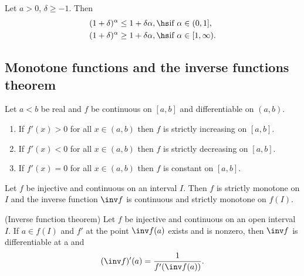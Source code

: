 \documentclass{article}
\begin{document}
\begin{lemma*}
    Let $a>0$, $\delta \geq -1$. Then
    \begin{align*}
        (1+\delta)^\alpha&\leq 1+\delta\alpha,\hs\text{if }\alpha\in(0,1],\\
        (1+\delta)^\alpha&\geq 1+\delta\alpha,\hs\text{if }\alpha\in[1,\infty).
    \end{align*} 
\end{lemma*}

\subsection{Monotone functions and the inverse functions theorem}

\setcounter{theorem}{1}
\begin{theorem}[Ross, 29.7]
   Let $a<b$ be real and $f$ be continuous on $[a,b]$ and differentiable
   on $(a,b)$.
   \begin{enumerate}[label=(\arabic*)]
       \item If $f'(x)>0$ for all $x\in(a,b)$ then $f$ is strictly increasing on $[a,b]$.
       \item If $f'(x)<0$ for all $x\in(a,b)$ then $f$ is strictly decreasing on $[a,b]$.
       \item If $f'(x)=0$ for all $x\in(a,b)$ then $f$ is constant on $[a,b]$. 
   \end{enumerate} 
\end{theorem}

\begin{theorem}
    Let $f$ be injective and continuous on an interval $I$. Then $f$ is strictly
    monotone on $I$ and the inverse function $\inv f$ is continuous and
    strictly monotone on $f(I)$. 
\end{theorem}

\setcounter{theorem}{4}
\begin{theorem}(Inverse function theorem)
    Let $f$ be injective and continuous on an open interval $I$.
    If $a\in f(I)$ and $f'$ at the point $\inv f(a)$ exists and is
    nonzero, then $\inv f$ is differentiable at a and
    \begin{align*}
        (\inv f)'(a) = \frac{1}{f'(\inv f(a))}.
    \end{align*}
\end{theorem}
\end{document}
